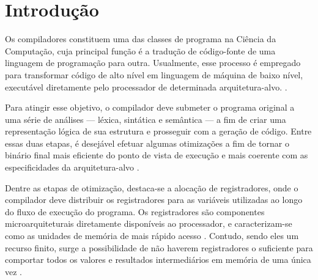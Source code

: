 \documentclass[
	12pt,				%
	openright,			%
	twoside,			%
	a4paper,			%
	tcc,			%
	]{ABNT-DC-UEL}
\begin{document}

\tableofcontents*
\cleardoublepage



\textual
\pagestyle{dc-uel-header} %


\chapter{Introdução}
Os compiladores constituem uma das classes de programa na Ciência da Computação, cuja principal função é a tradução de código-fonte de uma linguagem de programação para outra. Usualmente, esse processo é empregado para transformar código de alto nível em linguagem de máquina de baixo nível, executável diretamente pelo processador de determinada arquitetura-alvo. \cite{aho:07}.

Para atingir esse objetivo, o compilador deve submeter o programa original a uma série de análises --- léxica, sintática e semântica --- a fim de criar uma representação lógica de sua estrutura e prosseguir com a geração de código. Entre essas duas etapas, é desejável efetuar algumas otimizações a fim de tornar o binário final mais eficiente do ponto de vista de execução e mais coerente com as especificidades da arquitetura-alvo \cite{muchnick:97}.

Dentre as etapas de otimização, destaca-se a alocação de registradores, onde o compilador deve distribuir os registradores para as variáveis utilizadas ao longo do fluxo de execução do programa. Os registradores são componentes microarquiteturais diretamente disponíveis ao processador, e caracterizam-se como as unidades de memória de mais rápido acesso \cite{mittal:16}. Contudo, sendo eles um recurso finito, surge a possibilidade de não haverem registradores o suficiente para comportar todos os valores e resultados intermediários em memória de uma única vez \cite{aho:07}.
\end{document}
